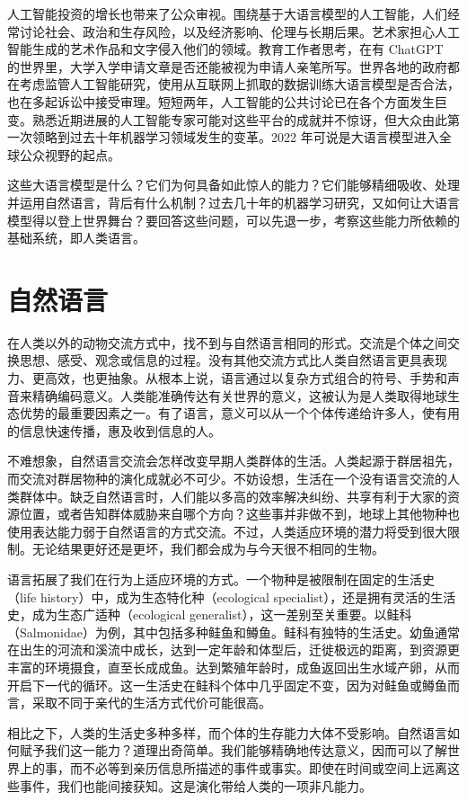 人工智能投资的增长也带来了公众审视。围绕基于大语言模型的人工智能，人们经常讨论社会、政治和生存风险，以及经济影响、伦理与长期后果。艺术家担心人工智能生成的艺术作品和文字侵入他们的领域。教育工作者思考，在有 ChatGPT 的世界里，大学入学申请文章是否还能被视为申请人亲笔所写。世界各地的政府都在考虑监管人工智能研究，使用从互联网上抓取的数据训练大语言模型是否合法，也在多起诉讼中接受审理。短短两年，人工智能的公共讨论已在各个方面发生巨变。熟悉近期进展的人工智能专家可能对这些平台的成就并不惊讶，但大众由此第一次领略到过去十年机器学习领域发生的变革。2022 年可说是大语言模型进入全球公众视野的起点。

这些大语言模型是什么？它们为何具备如此惊人的能力？它们能够精细吸收、处理并运用自然语言，背后有什么机制？过去几十年的机器学习研究，又如何让大语言模型得以登上世界舞台？要回答这些问题，可以先退一步，考察这些能力所依赖的基础系统，即人类语言。

\section{自然语言}
在人类以外的动物交流方式中，找不到与自然语言相同的形式。交流是个体之间交换思想、感受、观念或信息的过程。没有其他交流方式比人类自然语言更具表现力、更高效，也更抽象。从根本上说，语言通过以复杂方式组合的符号、手势和声音来精确编码意义。人类能准确传达有关世界的意义，这被认为是人类取得地球生态优势的最重要因素之一。有了语言，意义可以从一个个体传递给许多人，使有用的信息快速传播，惠及收到信息的人。

不难想象，自然语言交流会怎样改变早期人类群体的生活。人类起源于群居祖先，而交流对群居物种的演化成就必不可少。不妨设想，生活在一个没有语言交流的人类群体中。缺乏自然语言时，人们能以多高的效率解决纠纷、共享有利于大家的资源位置，或者告知群体威胁来自哪个方向？这些事并非做不到，地球上其他物种也使用表达能力弱于自然语言的方式交流。不过，人类适应环境的潜力将受到很大限制。无论结果更好还是更坏，我们都会成为与今天很不相同的生物。

语言拓展了我们在行为上适应环境的方式。一个物种是被限制在固定的生活史（life history）中，成为生态特化种（ecological specialist），还是拥有灵活的生活史，成为生态广适种（ecological generalist），这一差别至关重要。以鲑科（Salmonidae）为例，其中包括多种鲑鱼和鳟鱼。鲑科有独特的生活史。幼鱼通常在出生的河流和溪流中成长，达到一定年龄和体型后，迁徙极远的距离，到资源更丰富的环境摄食，直至长成成鱼。达到繁殖年龄时，成鱼返回出生水域产卵，从而开启下一代的循环。这一生活史在鲑科个体中几乎固定不变，因为对鲑鱼或鳟鱼而言，采取不同于亲代的生活方式代价可能很高。

相比之下，人类的生活史多种多样，而个体的生存能力大体不受影响。自然语言如何赋予我们这一能力？道理出奇简单。我们能够精确地传达意义，因而可以了解世界上的事，而不必等到亲历信息所描述的事件或事实。即使在时间或空间上远离这些事件，我们也能间接获知。这是演化带给人类的一项非凡能力。

